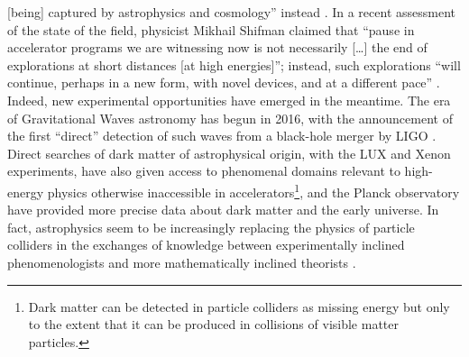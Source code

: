 \documentclass{article}
\begin{document}
[being] captured by astrophysics and cosmology'' instead \citep{Kosyakov2023}. In a recent assessment of the state of the field, physicist Mikhail Shifman claimed that ``pause in accelerator programs we are witnessing now is not necessarily [\dots] the end of explorations at short distances [at high energies]''; instead, such explorations ``will continue, perhaps in a new form, with novel devices, and at a different pace'' \citep{Shifman2020}. Indeed, new experimental opportunities have emerged in the meantime. The era of Gravitational Waves astronomy has begun in 2016, with the announcement of the first ``direct'' detection of such waves from a black-hole merger by LIGO \citep{Abbott2016}. Direct searches of dark matter of astrophysical origin, with the LUX and Xenon experiments, have also given access to phenomenal domains relevant to high-energy physics otherwise inaccessible in accelerators\footnote{Dark matter can be detected in particle colliders as missing energy but only to the extent that it can be produced in collisions of visible matter particles.}, and the Planck observatory \citep{planck2011planck} have provided more precise data about dark matter and the early universe. %
In fact, astrophysics seem to be increasingly replacing the physics of particle colliders in the exchanges of knowledge between experimentally inclined phenomenologists and more mathematically inclined theorists \citep{Gautheron2023}.
\end{document}

